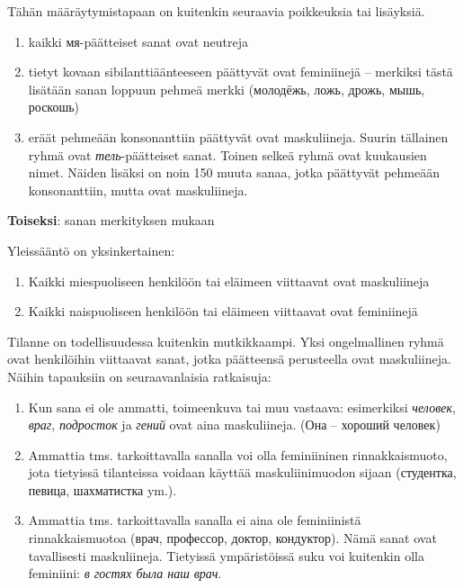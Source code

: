\documentclass[]{scrreprt}
\providecommand{\tightlist}{%
  \setlength{\itemsep}{0pt}\setlength{\parskip}{0pt}}
\begin{document}
Tähän määräytymistapaan on kuitenkin seuraavia poikkeuksia tai
lisäyksiä.

\begin{enumerate}
\def\labelenumi{\arabic{enumi}.}
\tightlist
\item
  kaikki мя-päätteiset sanat ovat neutreja
\item
  tietyt kovaan sibilanttiäänteeseen päättyvät ovat feminiinejä --
  merkiksi tästä lisätään sanan loppuun pehmeä merkki (молодёжь, ложь,
  дрожь, мышь, роскошь)
\item
  eräät pehmeään konsonanttiin päättyvät ovat maskuliineja. Suurin
  tällainen ryhmä ovat \emph{тель}-päätteiset sanat. Toinen selkeä ryhmä
  ovat kuukausien nimet. Näiden lisäksi on noin 150 muuta sanaa, jotka
  päättyvät pehmeään konsonanttiin, mutta ovat maskuliineja.
\end{enumerate}

\textbf{Toiseksi}: sanan merkityksen mukaan

Yleissääntö on yksinkertainen:

\begin{enumerate}
\def\labelenumi{\arabic{enumi}.}
\tightlist
\item
  Kaikki miespuoliseen henkilöön tai eläimeen viittaavat ovat
  maskuliineja
\item
  Kaikki naispuoliseen henkilöön tai eläimeen viittaavat ovat
  feminiinejä
\end{enumerate}

Tilanne on todellisuudessa kuitenkin mutkikkaampi. Yksi ongelmallinen
ryhmä ovat henkilöihin viittaavat sanat, jotka päätteensä perusteella
ovat maskuliineja. Näihin tapauksiin on seuraavanlaisia ratkaisuja:

\begin{enumerate}
\def\labelenumi{\arabic{enumi}.}
\tightlist
\item
  Kun sana ei ole ammatti, toimeenkuva tai muu vastaava: esimerkiksi
  \emph{человек}, \emph{враг}, \emph{подросток} ja \emph{гений} ovat
  aina maskuliineja. (Она -- хороший человек)
\item
  Ammattia tms. tarkoittavalla sanalla voi olla feminiininen
  rinnakkaismuoto, jota tietyissä tilanteissa voidaan käyttää
  maskuliinimuodon sijaan (студентка, певица, шахматистка ym.).
\item
  Ammattia tms. tarkoittavalla sanalla ei aina ole feminiinistä
  rinnakkaismuotoa (врач, профессор, доктор, кондуктор). Nämä sanat ovat
  tavallisesti maskuliineja. Tietyissä ympäristöissä suku voi kuitenkin
  olla feminiini: \emph{в гостях была наш врач}.
\end{enumerate}
\end{document}
